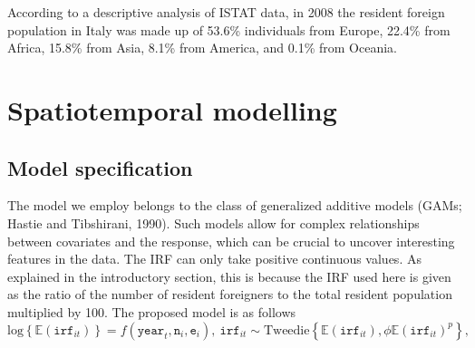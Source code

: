 \documentclass[12pt]{article}
\newcommand{\beq}{\begin{equation}}
\newcommand{\eeq}{\end{equation}}
\newcommand{\E}{\mathbb{E}}
\theoremstyle{definition}
\theoremstyle{plain}
\begin{document}
According to a descriptive analysis of ISTAT data, in 2008 the resident foreign population in Italy was made up of 53.6\% individuals from Europe, 22.4\% from Africa, 15.8\% from Asia, 8.1\% from America, and 0.1\% from Oceania.

\section{Spatiotemporal modelling \label{METH}}

\subsection{Model specification \label{MS}}

The model we employ belongs to the class of generalized additive models (GAMs; Hastie and Tibshirani, 1990). Such models allow for complex relationships between covariates and the response, which can be crucial to uncover interesting features in the data. The IRF can only take positive continuous values. As explained in the introductory section, this is because the IRF used here is given as the ratio of the number of resident foreigners to the total resident population multiplied by 100. The proposed model is as follows
\beq
\text{log}\left\{\E(\texttt{irf}_{it})\right\} = f(\texttt{year}_t,\texttt{n}_i,\texttt{e}_i), \ \texttt{irf}_{it} \sim \text{Tweedie}\left\{\E(\texttt{irf}_{it}),\phi \E(\texttt{irf}_{it})^{p}\right\},          
\label{PropM}
\eeq
\end{document}
